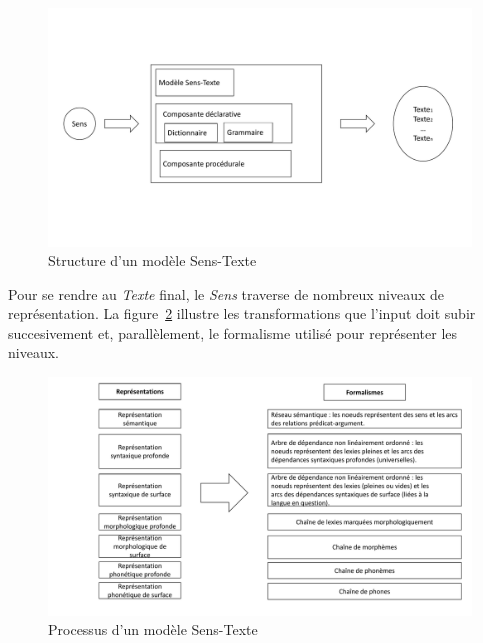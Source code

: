 \begin{figure}[htb]
	\centering
	\includegraphics[width=1\textwidth, trim = {0cm 4cm 0cm 4cm},clip]{ch3/figs/polguere1.pdf}
	\caption{Structure d'un modèle Sens-Texte \citep{PolgueretheorieSensTexte1998}}
	\label{fig:modeletst}
\end{figure}

Pour se rendre au \emph{Texte} final, le \emph{Sens} traverse de nombreux niveaux de représentation. La figure~\ref{fig:processustst} illustre les transformations que l'input doit subir succesivement et, parallèlement, le formalisme utilisé pour représenter les niveaux.

\begin{figure}[htb]
	\centering
	\includegraphics[width=1\textwidth, trim = {0cm 0cm 0cm 0cm},clip]{ch3/figs/polguere2.pdf}
	\caption{Processus d'un modèle Sens-Texte \citep{PolgueretheorieSensTexte1998}}
	\label{fig:processustst}
\end{figure}


